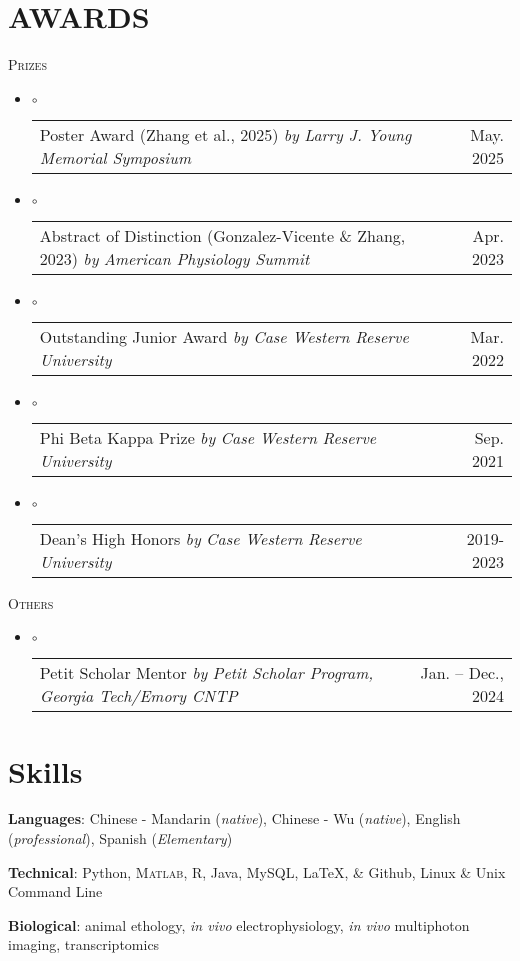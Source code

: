 \documentclass[letterpaper,11pt]{article}
\makeatletter
\newcommand{\resumeSubSection}[1]{%
  {\noindent\color{GlacierBlue}\scshape\large #1 \dotfill} \vspace{-6pt}
}
\newcommand{\resumeAwardItemListStart}{%
    \begin{itemize}[leftmargin=0pt, label={}]\vspace{0pt}
}
\newcommand{\resumeAwardItemListEnd}{%
    \end{itemize}\vspace{6pt}
}
\newcommand{\resumeAwardItem}[3]{%
    \item
    {\color{GlacierBlue}$\circ$} 
    \begin{tabular*}{\dimexpr\linewidth-9pt\relax}[t]{@{\extracolsep{\fill}}l r}
       { {#1} {\small\color{GlacierBlue} \textit{by} }{\small \textit{#2}}} & {\small#3}
    \end{tabular*}\vspace{-8pt}
}
\makeatother
\begin{document}
\section{AWARDS}
	\resumeSubSection{Prizes}
		\resumeAwardItemListStart
			\resumeAwardItem{Poster Award (Zhang et al., 2025)}{Larry J. Young Memorial Symposium}{May. 2025}
			\resumeAwardItem{Abstract of Distinction (Gonzalez-Vicente \& Zhang, 2023)}{American Physiology Summit}{Apr. 2023}
			\resumeAwardItem{Outstanding Junior Award}{Case Western Reserve University}{Mar. 2022}
			\resumeAwardItem{Phi Beta Kappa Prize}{Case Western Reserve University}{Sep. 2021}
			\resumeAwardItem{Dean's High Honors}{Case Western Reserve University}{2019-2023}
		\resumeAwardItemListEnd
	\resumeSubSection{Others}
		\resumeAwardItemListStart
			\resumeAwardItem{Petit Scholar Mentor}{Petit Scholar Program, Georgia Tech/Emory CNTP}{Jan. -- Dec., 2024}
		\resumeAwardItemListEnd
\vspace{-8pt}

\section{Skills}
	\textbf{Languages}: Chinese - Mandarin (\textit{native}), Chinese - Wu (\textit{native}), English (\textit{professional}), Spanish (\textit{Elementary})

	\textbf{Technical}: {\color{GlacierBlue}\faPython} Python, {\color{GlacierBlue}\textsc{Matlab}}, {\color{GlacierBlue}\faRProject} R, {\color{GlacierBlue}\faJava} Java, {\color{GlacierBlue}\faDatabase} MySQL, {\color{GlacierBlue}\LaTeX}, {\color{GlacierBlue} \faGitSquare} \& {\color{GlacierBlue} \faGithubSquare} Github, {\color{GlacierBlue} \faLinux} Linux \& Unix Command Line

	\textbf{Biological}: animal ethology, \textit{in vivo} electrophysiology, \textit{in vivo} multiphoton imaging, transcriptomics
\end{document}
